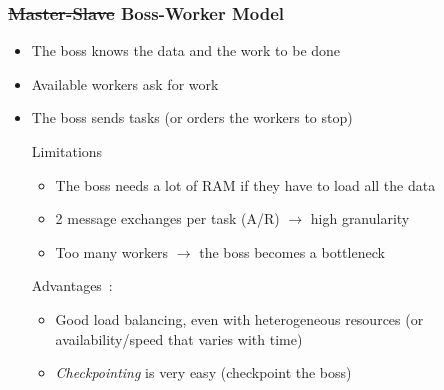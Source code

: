 \documentclass[xcolor={rgb,x11names,svgnames},rgb,x11names,svgnames]{beamer}
\begin{document}
\begin{frame}
  \frametitle{\sout{Master-Slave} Boss-Worker  Model}

  \begin{itemize}
  \item The boss knows the data and the work to be done
  \item Available workers ask for work
  \item The boss sends tasks (or orders the workers to stop)
    \begin{alertblock}{Limitations}
      \begin{itemize}
      \item The boss needs a lot of RAM if they have to load all the data
      \item 2 message exchanges per task (A/R) $\longrightarrow$ high granularity
      \item Too many workers $\rightarrow$ the boss becomes a bottleneck
      \end{itemize}
    \end{alertblock}
    
    \begin{exampleblock}{Advantages~:}
      \begin{itemize}
      \item Good load balancing, even with heterogeneous resources (or availability/speed that varies with time)
      \item \emph{Checkpointing} is very easy (checkpoint the boss)
      \end{itemize}
    \end{exampleblock}
  \end{itemize}
\end{frame}
\end{document}
